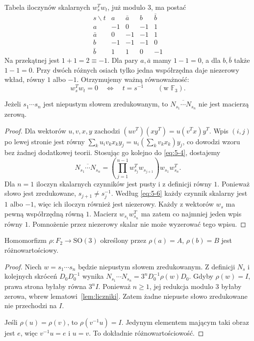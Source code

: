 Tabela iloczynów skalarnych $w_s^Tw_t$, już modulo $3$, ma postać
\begin{equation}\label{eq:5-5}
\begin{array}{c|rrrr}
 s\backslash t&a&\bar a&b&\bar b\\\hline
 a&-1&0&-1&1\\
 \bar a&0&-1&-1&1\\
 b&-1&-1&-1&0\\
 \bar b&1&1&0&-1
\end{array}
\end{equation}
Na przekątnej jest $1+1=2\equiv-1$. Dla pary $a,\bar a$ mamy $1-1=0$, a dla $b,\bar b$ także $1-1=0$. Przy dwóch różnych osiach tylko jedna współrzędna daje niezerowy wkład, równy $1$ albo $-1$. Otrzymujemy ważną równoważność:
\begin{equation}\label{eq:5-6}
 w_s^Tw_t=0\quad\Longleftrightarrow\quad t=s^{-1} \qquad(\text{w }\mathbb F_3).
\end{equation}
\begin{lemat}\label{lem:liczniki}
Jeżeli $s_1\cdots s_n$ jest niepustym słowem zredukowanym, to $\overline{N_{s_1}\cdots N_{s_n}}$ nie jest macierzą zerową.
\end{lemat}
\begin{proof}
Dla wektorów $u,v,x,y$ zachodzi $(uv^T)(xy^T)=u(v^Tx)y^T$. Wpis $(i,j)$ po lewej stronie jest równy $\sum_k u_iv_kx_ky_j=u_i(\sum_kv_kx_k)y_j$, co dowodzi wzoru bez żadnej dodatkowej teorii. Stosując go kolejno do \eqref{eq:5-4}, dostajemy
\begin{equation}\label{eq:5-7}
 \overline{N_{s_1}\cdots N_{s_n}}=
 \left(\prod_{j=1}^{n-1}w_{s_j}^Tw_{s_{j+1}}\right)w_{s_1}w_{s_n}^T.
\end{equation}
Dla $n=1$ iloczyn skalarnych czynników jest pusty i z definicji równy $1$. Ponieważ słowo jest zredukowane, $s_{j+1}\ne s_j^{-1}$. Według \eqref{eq:5-6} każdy czynnik skalarny jest $1$ albo $-1$, więc ich iloczyn również jest niezerowy. Każdy z wektorów $w_s$ ma pewną współrzędną równą $1$. Macierz $w_{s_1}w_{s_n}^T$ ma zatem co najmniej jeden wpis równy $1$. Pomnożenie przez niezerowy skalar nie może wyzerować tego wpisu.
\end{proof}
\begin{twierdzenie}\label{tw:wolne-obroty}
Homomorfizm $\rho:F_2\to\mathrm{SO}(3)$ określony przez $\rho(a)=A$, $\rho(b)=B$ jest różnowartościowy.
\end{twierdzenie}
\begin{proof}
Niech $w=s_1\cdots s_n$ będzie niepustym słowem zredukowanym. Z definicji $N_s$ i kolejnych skróceń $D_0D_0^{-1}$ wynika $N_{s_1}\cdots N_{s_n}=3^nD_0^{-1}\rho(w)D_0$. Gdyby $\rho(w)=I$, prawa strona byłaby równa $3^nI$. Ponieważ $n\ge1$, jej redukcja modulo $3$ byłaby zerowa, wbrew lematowi~\ref{lem:liczniki}. Zatem żadne niepuste słowo zredukowane nie przechodzi na $I$.

Jeśli $\rho(u)=\rho(v)$, to $\rho(v^{-1}u)=I$. Jedynym elementem mającym taki obraz jest $e$, więc $v^{-1}u=e$ i $u=v$. To dokładnie różnowartościowość.
\end{proof}
